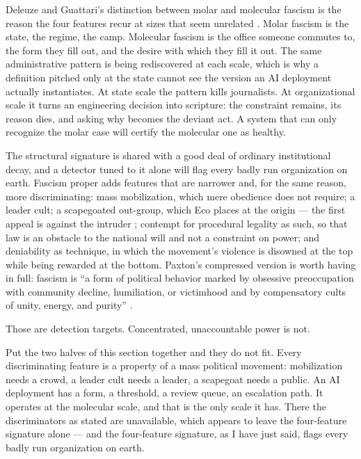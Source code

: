 Deleuze and Guattari's distinction between molar and molecular fascism is the reason the four features recur at sizes that seem unrelated \autocite{deleuze1987plateaus}. Molar fascism is the state, the regime, the camp. Molecular fascism is the office someone commutes to, the form they fill out, and the desire with which they fill it out. The same administrative pattern is being rediscovered at each scale, which is why a definition pitched only at the state cannot see the version an AI deployment actually instantiates. At state scale the pattern kills journalists. At organizational scale it turns an engineering decision into scripture: the constraint remains, its reason dies, and asking why becomes the deviant act. A system that can only recognize the molar case will certify the molecular one as healthy.

The structural signature is shared with a good deal of ordinary institutional decay, and a detector tuned to it alone will flag every badly run organization on earth. Fascism proper adds features that are narrower and, for the same reason, more discriminating: mass mobilization, which mere obedience does not require; a leader cult; a scapegoated out-group, which Eco places at the origin — the first appeal is against the intruder \autocite{eco1995urfascism}; contempt for procedural legality as such, so that law is an obstacle to the national will and not a constraint on power; and deniability as technique, in which the movement's violence is disowned at the top while being rewarded at the bottom. Paxton's compressed version is worth having in full: fascism is “a form of political behavior marked by obsessive preoccupation with community decline, humiliation, or victimhood and by compensatory cults of unity, energy, and purity” \autocite{paxton2004anatomy}.

Those are detection targets. Concentrated, unaccountable power is not.

Put the two halves of this section together and they do not fit. Every discriminating feature is a property of a mass political movement: mobilization needs a crowd, a leader cult needs a leader, a scapegoat needs a public. An AI deployment has a form, a threshold, a review queue, an escalation path. It operates at the molecular scale, and that is the only scale it has. There the discriminators as stated are unavailable, which appears to leave the four-feature signature alone — and the four-feature signature, as I have just said, flags every badly run organization on earth.


